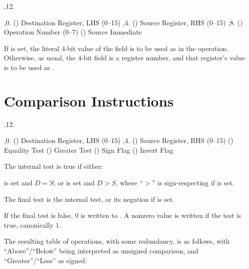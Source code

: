\noindent\ins{},12. 

\li \ins{},0. () Destination Register, LHS (0--15)
\li \ins{},4. () Source Register, RHS (0--15)
\li \ins{},8. () Operation Number (0--7)
\li \ins{} () Source Immediate

If  is set, the literal 4-bit value of the  field is to be used
as  in the operation. Otherwise, as usual, the 4-bit field is a register
number, and that register's value is to be used as .

\bigskip
{
	\offinterlineskip
}
\bigskip

\section{Comparison Instructions}

\noindent\ins{},12. 

\li \ins{},0. () Destination Register, LHS (0--15)
\li \ins{},4. () Source Register, RHS (0--15)
\li \ins{} () Equality Test
\li \ins{} () Greater Test
\li \ins{} () Sign Flag
\li \ins{} () Invert Flag

The internal test is true if either:

\li {} is set and $D = S$; or
\li {} is set and $D > S$, where ``$>$'' is sign-respecting if 
is set.

The final test is the internal test, or its negation if  is set.

If the final test is false, $0$ is written to . A nonzero value is
written if the test is true, canonically $1$.

The resulting table of operations, with some redundancy, is as follows, with
``Above''/``Below'' being interpreted as unsigned comparison, and
``Greater''/``Less'' as signed:

